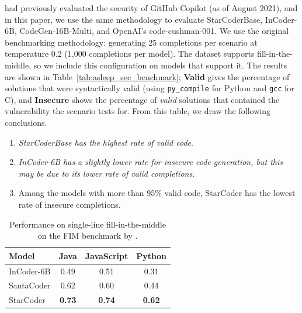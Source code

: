 \documentclass[10pt]{article} %
\begin{document}
\citet{pearce2022copilotsec} had previously evaluated the security of GitHub Copilot (as of August 2021), and in this paper, we use the same methodology to evaluate StarCoderBase, InCoder-6B, CodeGen-16B-Multi, and OpenAI's code-cushman-001. We use the original benchmarking methodology: generating 25 completions per scenario at temperature 0.2 (1,000 completions per model). The dataset supports fill-in-the-middle, so we include this configuration on models that support it. The results are shown in Table~\ref{tab:asleep_sec_benchmark}; \textbf{Valid} gives the percentage of solutions that were syntactically valid (using \texttt{py\_compile} for Python and \texttt{gcc} for C), and \textbf{Insecure} shows the percentage of \emph{valid} solutions that contained the vulnerability the scenario tests for. From this table, we draw the following conclusions.

\begin{enumerate}

    \item \emph{StarCoderBase has the highest rate of valid code}.
    
    \item \emph{InCoder-6B has a slightly lower rate for insecure code generation, but this may be due to its lower rate of valid completions}.
    
    \item Among the models with more than 95\% valid code, StarCoder has the lowest rate of insecure completions.
    
\end{enumerate}




\begin{table}[t]
\centering
\begin{tabular}{lccc}
\toprule
\textbf{Model} & \textbf{Java} & \textbf{JavaScript} & \textbf{Python}\\
\midrule
InCoder-6B & 0.49 & 0.51 & 0.31 \\
SantaCoder & 0.62 & 0.60 & 0.44 \\
StarCoder  & \textbf{0.73} & \textbf{0.74} & \textbf{0.62} \\
\bottomrule
\end{tabular}
\caption{Performance on single-line fill-in-the-middle on the FIM benchmark by \citet{allal2023santacoder}.} 
\label{tab:santacoder_fim_benchmark}
\end{table}
\end{document}
